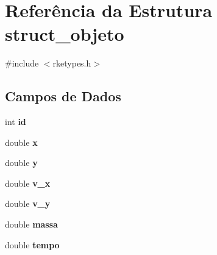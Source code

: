 \hypertarget{structstruct__objeto}{
\section{Referência da Estrutura struct\_\-objeto}
\label{structstruct__objeto}
}


{\ttfamily \#include $<$rketypes.h$>$}

\subsection*{Campos de Dados}
\begin{DoxyCompactItemize}
\item 
\hypertarget{structstruct__objeto_a7441ef0865bcb3db9b8064dd7375c1ea}{
int {\bfseries id}}
\label{structstruct__objeto_a7441ef0865bcb3db9b8064dd7375c1ea}

\item 
\hypertarget{structstruct__objeto_af88b946fb90d5f08b5fb740c70e98c10}{
double {\bfseries x}}
\label{structstruct__objeto_af88b946fb90d5f08b5fb740c70e98c10}

\item 
\hypertarget{structstruct__objeto_ab927965981178aa1fba979a37168db2a}{
double {\bfseries y}}
\label{structstruct__objeto_ab927965981178aa1fba979a37168db2a}

\item 
\hypertarget{structstruct__objeto_af8ea4d2851d2d656fd42be239e36ce6e}{
double {\bfseries v\_\-x}}
\label{structstruct__objeto_af8ea4d2851d2d656fd42be239e36ce6e}

\item 
\hypertarget{structstruct__objeto_a2161079bbf87834cfdf4d3548a53eb3b}{
double {\bfseries v\_\-y}}
\label{structstruct__objeto_a2161079bbf87834cfdf4d3548a53eb3b}

\item 
\hypertarget{structstruct__objeto_a3cb08d781a7ecc13047f1631906f7df5}{
double {\bfseries massa}}
\label{structstruct__objeto_a3cb08d781a7ecc13047f1631906f7df5}

\item 
\hypertarget{structstruct__objeto_aff2f6d52166217d13f9b2072c9e67c13}{
double {\bfseries tempo}}
\label{structstruct__objeto_aff2f6d52166217d13f9b2072c9e67c13}

\end{DoxyCompactItemize}


